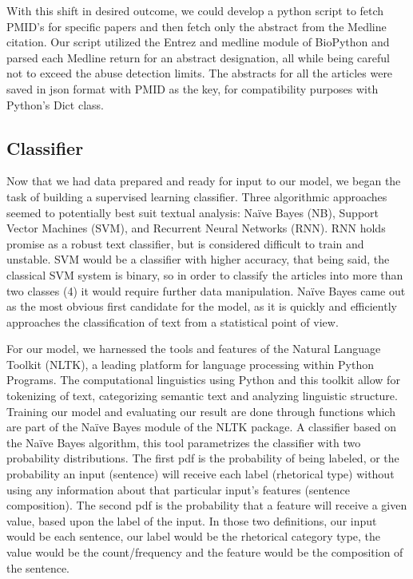 \documentclass{article} %
\begin{document}
With this shift in desired outcome, we could develop a python script to fetch PMID’s for specific papers and then fetch only the abstract from the Medline citation. Our script utilized the Entrez and medline module of BioPython and parsed each Medline return for an abstract designation, all while being careful not to exceed the abuse detection limits. The abstracts for all the articles were saved in json format with PMID as the key, for compatibility purposes with Python's Dict class.

\subsection{Classifier}
Now that we had data prepared and ready for input to our model, we began the task of building a supervised learning classifier. Three algorithmic approaches seemed to potentially best suit textual analysis: Naïve Bayes (NB), Support Vector Machines (SVM), and Recurrent Neural Networks (RNN). RNN holds promise as a robust text classifier, but is considered difficult to train and unstable. SVM would be a classifier with higher accuracy, that being said, the classical SVM system is binary, so in order to classify the articles into more than two classes (4) it would require further data manipulation. Naïve Bayes came out as the most obvious first candidate for the model, as it is quickly and efficiently approaches the classification of text from a statistical point of view.

For our model, we harnessed the tools and features of the Natural Language Toolkit (NLTK), a leading platform for language processing within Python Programs. The computational linguistics using Python and this toolkit allow for tokenizing of text, categorizing semantic text and analyzing linguistic structure. Training our model and evaluating our result are done through functions which are part of the Naïve Bayes module of the NLTK package. A classifier based on the Naïve Bayes algorithm, this tool parametrizes the classifier with two probability distributions. The first pdf is the probability of being labeled, or the probability an input (sentence) will receive each label (rhetorical type) without using any information about that particular input’s features (sentence composition). The second pdf is the probability that a feature will receive a given value, based upon the label of the input. In those two definitions, our input would be each sentence, our label would be the rhetorical category type, the value would be the count/frequency and the feature would be the composition of the sentence. 
\end{document}
